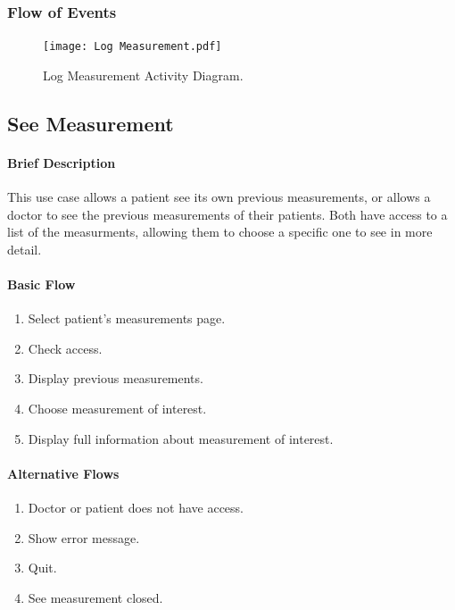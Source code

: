 \documentclass{report}
\begin{document}
\vspace{-1em}
\subsubsection{Flow of Events}
\begin{figure}[ht]
    \centering
    \texttt{[image: Log Measurement.pdf]}
    \caption{Log Measurement Activity Diagram.}
    \label{fig:Log Measure}
\end{figure}

\clearpage
\subsection{See Measurement}

\paragraph{Brief Description}
This use case allows a patient see its own previous measurements, or allows a doctor to see the previous measurements of their patients.
Both have access to a list of the measurments, allowing them to choose a specific one to see in more detail.

\begin{multicols}{2}
    \paragraph{Basic Flow}
    \begin{enumerate}
        \item Select patient's measurements page.
        \item Check access.
        \item Display previous measurements.
        \item Choose measurement of interest.
        \item Display full information about measurement of interest.
    \end{enumerate}
    \columnbreak
    
    \paragraph{Alternative Flows}
    \begin{enumerate}[label=A\arabic*.]
        \item Doctor or patient does not have access.
        \item Show error message.
        \item Quit.
        \item See measurement closed.
    \end{enumerate}
\end{multicols}
\end{document}
